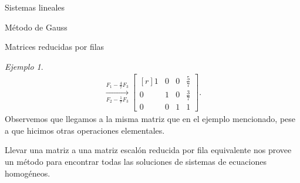 \documentclass[a4paper,12pt,twoside,spanish,reqno]{amsbook}
\numberwithin{equation}{section}
\theoremstyle{definition}
\theoremstyle{remark}
\newtheorem*{ejemplo*}{Ejemplo}
\begin{document}
\begin{chapter}{Sistemas lineales}
\begin{section}{Método de Gauss }
\begin{subsection}{Matrices reducidas por filas}
\begin{ejemplo*}
\begin{multline*}
                    \underset{F_2-\frac17F_3}{\stackrel{F_1 -\frac47 F_3}{\longrightarrow}} 
                    \begin{bmatrix*}[r] 1& 0&0& \frac{5}7 \\ 0&1 &0&\frac37 \\ 0&0&1&1 \end{bmatrix*}.
                    \end{multline*}
                    Observemos que llegamos a la misma matriz que en el ejemplo mencionado, pese a que hicimos otras operaciones elementales.
                \end{ejemplo*}
                

                
            
                
    
                
                Llevar una matriz a una matriz  escalón reducida por fila equivalente nos provee un método para encontrar todas las soluciones de sistemas de ecuaciones homogéneos.
                

\end{subsection}
\end{section}
\end{chapter}
\end{document}
